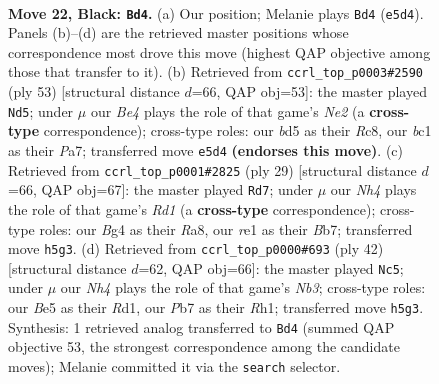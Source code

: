 \documentclass[11pt]{article}
\begin{document}
\clearpage

\begin{figure}[p]\centering
\begin{subfigure}{0.46\textwidth}\centering
\resizebox{\linewidth}{!}{%
\newchessgame
\chessboard[
  setfen={1r3r2/pp4k1/6pp/2pBb2n/4p1bP/N5P1/PP1P1P2/1RB1RK2 b - - 3 22},
  showmover=false,
  pgfstyle=straightmove, color=movearrow, markmove={e5-d4}
]}
\caption{}
\end{subfigure}\hfill
\begin{subfigure}{0.46\textwidth}\centering
\resizebox{\linewidth}{!}{%
\newchessgame
\chessboard[
  setfen={2rr2k1/p3npp1/4p2p/7P/bP1b2N1/P4BP1/1P3P2/R1B1RK2 b - - 8 27},
  showmover=false,
  pgfstyle=straightmove, color=movearrow, markmove={e7-d5}
]}
\caption{}
\end{subfigure}
\\[4pt]
\begin{subfigure}{0.46\textwidth}\centering
\resizebox{\linewidth}{!}{%
\newchessgame
\chessboard[
  setfen={r2r2k1/pb2bppp/1p3n2/4p3/4P1P1/P1NBB2P/1PP1K3/R6R b - - 0 15},
  showmover=false,
  pgfstyle=straightmove, color=movearrow, markmove={d8-d7}
]}
\caption{}
\end{subfigure}\hfill
\begin{subfigure}{0.46\textwidth}\centering
\resizebox{\linewidth}{!}{%
\newchessgame
\chessboard[
  setfen={r1b4r/1p1nkp2/6pb/p3p3/P4P1p/1N2BB2/1PP4P/1K1R3R w - - 0 22},
  showmover=false,
  pgfstyle=straightmove, color=movearrow, markmove={b3-c5}
]}
\caption{}
\end{subfigure}
\caption{\textbf{Move 22, Black: \texttt{Bd4}.} (a) Our position; Melanie plays \texttt{Bd4} (\texttt{e5d4}). Panels (b)--(d) are the retrieved master positions whose correspondence most drove this move (highest QAP objective among those that transfer to it). (b) Retrieved from \texttt{ccrl\_top\_p0003\#2590} (ply 53) [structural distance $d$=66, QAP obj=53]: the master played \texttt{Nd5}; under $\mu$ our \emph{Be4} plays the role of that game's \emph{Ne2} (a \textbf{cross-type} correspondence); cross-type roles: our \emph{b}d5 as their \emph{R}c8, our \emph{b}c1 as their \emph{P}a7; transferred move \texttt{e5d4} \textbf{(endorses this move)}. (c) Retrieved from \texttt{ccrl\_top\_p0001\#2825} (ply 29) [structural distance $d$=66, QAP obj=67]: the master played \texttt{Rd7}; under $\mu$ our \emph{Nh4} plays the role of that game's \emph{Rd1} (a \textbf{cross-type} correspondence); cross-type roles: our \emph{B}g4 as their \emph{R}a8, our \emph{r}e1 as their \emph{B}b7; transferred move \texttt{h5g3}. (d) Retrieved from \texttt{ccrl\_top\_p0000\#693} (ply 42) [structural distance $d$=62, QAP obj=66]: the master played \texttt{Nc5}; under $\mu$ our \emph{Nh4} plays the role of that game's \emph{Nb3}; cross-type roles: our \emph{B}e5 as their \emph{R}d1, our \emph{P}b7 as their \emph{R}h1; transferred move \texttt{h5g3}. Synthesis: 1 retrieved analog transferred to \texttt{Bd4} (summed QAP objective 53, the strongest correspondence among the candidate moves); Melanie committed it via the \texttt{search} selector.}
\label{fig:thought-m43}
\end{figure}
\end{document}
